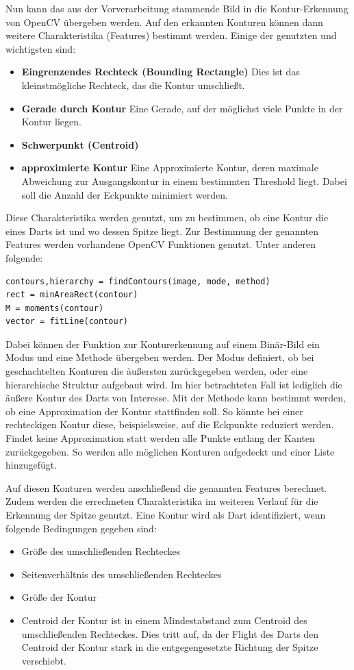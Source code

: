 Nun kann das aus der Vorverarbeitung stammende Bild in die Kontur-Erkennung von OpenCV übergeben werden. Auf den erkannten Konturen können dann weitere Charakteristika (Features) bestimmt werden. Einige der genutzten und wichtigsten sind:
\begin{itemize}
	\item \textbf{Eingrenzendes Rechteck (Bounding Rectangle)} Dies ist das kleinstmögliche Rechteck, das die Kontur umschließt.
	\item \textbf{Gerade durch Kontur} Eine Gerade, auf der möglichst viele Punkte in der Kontur liegen.
	\item \textbf{Schwerpunkt (Centroid)} 
	\item \textbf{approximierte Kontur} Eine Approximierte Kontur, deren maximale Abweichung zur Ausgangskontur in einem bestimmten Threshold liegt. Dabei soll die Anzahl der Eckpunkte minimiert werden.
\end{itemize}
Diese Charakteristika werden genutzt, um zu bestimmen, ob eine Kontur die eines Darts ist und wo dessen Spitze liegt. Zur Bestimmung der genannten Features werden vorhandene OpenCV Funktionen genutzt. Unter anderen folgende:
\begin{lstlisting}[frame=single]
contours,hierarchy = findContours(image, mode, method)
rect = minAreaRect(contour)
M = moments(contour)
vector = fitLine(contour)
\end{lstlisting}
Dabei können der Funktion zur Konturerkennung auf einem Binär-Bild ein Modus und eine Methode übergeben werden. Der Modus definiert, ob bei geschachtelten Konturen die äußersten zurückgegeben werden, oder eine hierarchische Struktur aufgebaut wird. Im hier betrachteten Fall ist lediglich die äußere Kontur des Darts von Interesse. Mit der Methode kann bestimmt werden, ob eine Approximation der Kontur stattfinden soll. So könnte bei einer rechteckigen Kontur diese, beispielsweise, auf die Eckpunkte reduziert werden. Findet keine Approximation statt werden alle Punkte entlang der Kanten zurückgegeben. So werden alle möglichen Konturen aufgedeckt und einer Liste hinzugefügt.

Auf diesen Konturen werden anschließend die genannten Features berechnet.
Zudem werden die errechneten Charakteristika im weiteren Verlauf für die Erkennung der Spitze genutzt.
Eine Kontur wird als Dart identifiziert, wenn folgende Bedingungen gegeben sind:
\begin{itemize}
	\item Größe des umschließenden Rechteckes
	\item Seitenverhältnis des umschließenden Rechteckes
	\item Größe der Kontur
	\item Centroid der Kontur ist in einem Mindestabstand zum Centroid des umschließenden Rechteckes. Dies tritt auf, da der Flight des Darts den Centroid der Kontur stark in die entgegengesetzte Richtung der Spitze verschiebt. 
\end{itemize}

